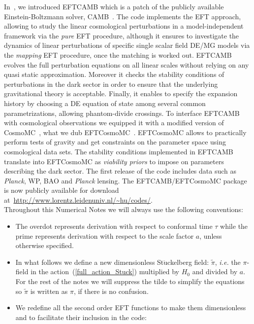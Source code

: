 \documentclass[prd,nofootinbib,showpacs]{revtex4}
\def\ie{{\frenchspacing\it i.e. }}
\begin{document}
{In~\cite{Hu:2013twa,Raveri:2014cka}, we introduced EFTCAMB which is a patch of  the publicly available  Einstein-Boltzmann solver, CAMB~\cite{CAMB,Lewis:1999bs}. The code implements the EFT approach, allowing to study the linear cosmological perturbations  in a model-independent framework via the \textit{pure} EFT procedure, although it ensures to investigate the dynamics of linear perturbations of specific single scalar field DE/MG models via the \textit{mapping} EFT procedure, once the matching is worked out. EFTCAMB evolves the full perturbation equations on all linear scales without relying on any quasi static approximation. Moreover it checks the stability conditions of perturbations  in the dark sector in order to ensure that the underlying gravitational theory is acceptable.
Finally, it enables to specify the expansion history by choosing a DE equation of state among several common parametrizations, allowing phantom-divide crossings.
To interface EFTCAMB with cosmological observations we equipped it with a modified version of 
CosmoMC~\cite{Lewis:2002ah}, what we dub EFTCosmoMC~\cite{Raveri:2014cka}. EFTCosmoMC  allows to practically perform tests of gravity and get constraints on the parameter space using cosmological data sets. The stability conditions implemented in EFTCAMB translate into EFTCosmoMC  as {\it viability priors} to impose  on parameters describing the dark sector. The first release of the code includes data such as \textit{Planck}, WP, BAO and \textit{Planck} lensing. The EFTCAMB/EFTCosmoMC package is  now publicly available for download at~\url{http://www.lorentz.leidenuniv.nl/~hu/codes/}.\\

Throughout this Numerical Notes we will always use the following conventions:
\begin{itemize}
\item The overdot represents derivation with respect to conformal time $\tau$ while the prime represents derivation with respect to the scale factor $a$, unless otherwise specified.
\item In what follows we define a new dimensionless St$\ddot{\text{u}}$ckelberg field: $\widetilde{\pi}$,  \ie the $\pi$-field in the action~(\ref{full_action_Stuck}) multiplied by $H_0$ and divided by $a$. For the rest of the notes we will suppress the tilde to simplify the equations so $\widetilde{\pi}$ is written as $\pi$, if there is no confusion.
\item We redefine all the second order EFT functions to make them dimensionless and to facilitate their inclusion in the code: 
%


\end{itemize}}
\end{document}

